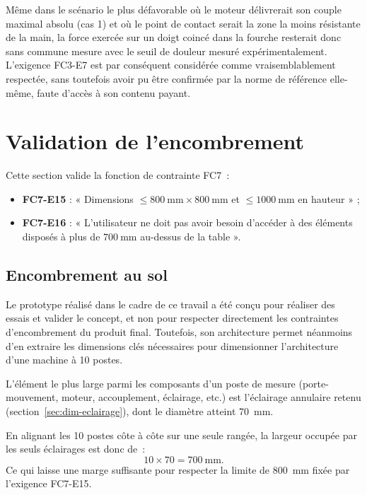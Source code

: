 Même dans le scénario le plus défavorable où le moteur délivrerait son couple
maximal absolu (cas 1) et où le point de contact serait la zone la moins
résistante de la main, la force exercée sur un doigt coincé dans la fourche
resterait donc sans commune mesure avec le seuil de douleur mesuré
expérimentalement. L'exigence FC3-E7 est par conséquent considérée comme
vraisemblablement respectée, sans toutefois avoir pu être confirmée par la
norme de référence elle-même, faute d'accès à son contenu payant.


\section{Validation de l'encombrement}
\label{sec:valid-encombrement}

Cette section valide la fonction de contrainte FC7~:
\begin{itemize}
    \item \textbf{FC7-E15} : « Dimensions $\leq 800\ \mathrm{mm} \times 800\ \mathrm{mm}$
          et $\leq 1000\ \mathrm{mm}$ en hauteur » ;
    \item \textbf{FC7-E16} : « L'utilisateur ne doit pas avoir besoin d'accéder
          à des éléments disposés à plus de $700\ \mathrm{mm}$ au-dessus de la
          table ».
\end{itemize}

\subsection{Encombrement au sol}

Le prototype réalisé dans le cadre de ce travail a été conçu pour réaliser des
essais et valider le concept, et non pour respecter directement les
contraintes d'encombrement du produit final. Toutefois, son architecture permet néanmoins d'en extraire
les dimensions clés nécessaires pour dimensionner l'architecture d'une machine
à 10 postes.

L'élément le plus large parmi les composants d'un poste de mesure
(porte-mouvement, moteur, accouplement, éclairage, etc.) est l'éclairage
annulaire retenu (section~\ref{sec:dim-eclairage}), dont le
diamètre atteint 70~mm.

En alignant les 10 postes côte à côte sur une seule rangée, la largeur
occupée par les seuls éclairages est donc de~:
\[
    10 \times 70 = 700\ \text{mm}.
\]
Ce qui laisse une marge suffisante pour
respecter la limite de 800~mm fixée par l'exigence FC7-E15.

